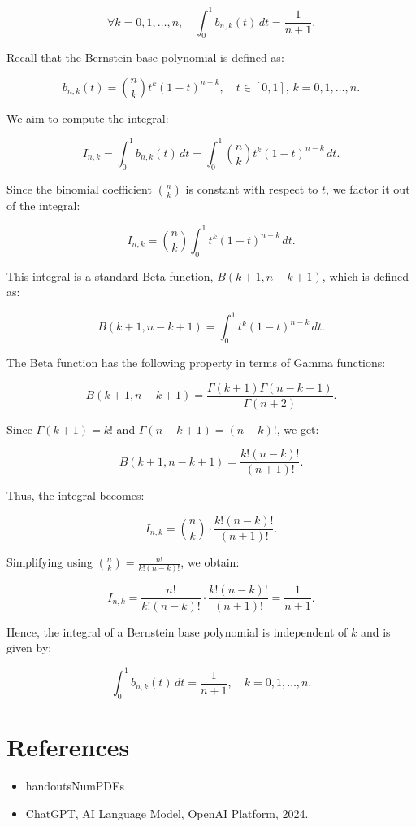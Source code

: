 \documentclass[a4paper, 12pt]{article}
\renewcommand{\qed}{\hfill \boxed{\mathbb{Q.E.D.}}}
\begin{document}
\[
\forall k = 0,1,\dots,n, \quad \int_0^1 b_{n,k}(t) \, dt = \frac{1}{n+1}.
\]

Recall that the Bernstein base polynomial is defined as:

\[
b_{n,k}(t) = \binom{n}{k} t^k (1 - t)^{n-k}, \quad t \in [0,1], \, k = 0,1,\dots,n.
\]

We aim to compute the integral:

\[
I_{n,k} = \int_0^1 b_{n,k}(t) \, dt = \int_0^1 \binom{n}{k} t^k (1 - t)^{n-k} \, dt.
\]

Since the binomial coefficient \( \binom{n}{k} \) is constant with respect to \( t \), we factor it out of the integral:

\[
I_{n,k} = \binom{n}{k} \int_0^1 t^k (1 - t)^{n-k} \, dt.
\]

This integral is a standard Beta function, \( B(k+1, n-k+1) \), which is defined as:

\[
B(k+1, n-k+1) = \int_0^1 t^k (1 - t)^{n-k} \, dt.
\]

The Beta function has the following property in terms of Gamma functions:

\[
B(k+1, n-k+1) = \frac{\Gamma(k+1)\Gamma(n-k+1)}{\Gamma(n+2)}.
\]

Since \( \Gamma(k+1) = k! \) and \( \Gamma(n-k+1) = (n-k)! \), we get:

\[
B(k+1, n-k+1) = \frac{k! (n-k)!}{(n+1)!}.
\]

Thus, the integral becomes:

\[
I_{n,k} = \binom{n}{k} \cdot \frac{k! (n-k)!}{(n+1)!}.
\]

Simplifying using \( \binom{n}{k} = \frac{n!}{k!(n-k)!} \), we obtain:

\[
I_{n,k} = \frac{n!}{k!(n-k)!} \cdot \frac{k!(n-k)!}{(n+1)!} = \frac{1}{n+1}.
\]

Hence, the integral of a Bernstein base polynomial is independent of \( k \) and is given by:

\[
\int_0^1 b_{n,k}(t) \, dt = \frac{1}{n+1}, \quad k = 0,1,\dots,n.
\]

\qed

\section*{References}
\begin{itemize}
   \item handoutsNumPDEs
   \item ChatGPT, AI Language Model, OpenAI Platform, 2024.
\end{itemize}
\end{document}
